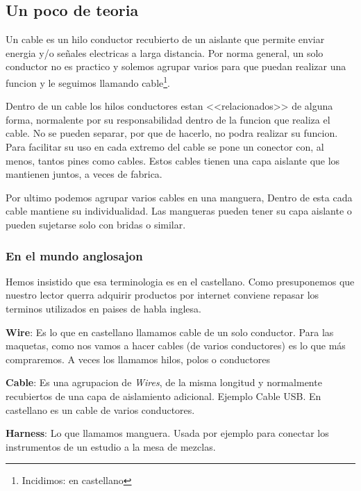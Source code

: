 
\subsection{Un poco de teoria}
Un cable es un hilo conductor recubierto de un aislante que permite enviar energia y/o señales electricas a larga distancia. Por norma general, un solo conductor no es practico y solemos agrupar varios para que puedan realizar una funcion y le seguimos llamando cable\footnote{Incidimos: en castellano}.

Dentro de un cable los hilos conductores estan <<relacionados>> de alguna forma, normalente por su responsabilidad dentro de la funcion que realiza el cable.
No se pueden separar, por que de hacerlo, no podra realizar su funcion. Para facilitar su uso en cada extremo del cable se pone un conector con, al menos, tantos pines como cables. Estos cables tienen una capa aislante que los mantienen juntos, a veces de fabrica.

Por ultimo podemos agrupar varios cables en una manguera, Dentro de esta cada cable mantiene su individualidad. Las mangueras pueden tener su capa aislante o pueden sujetarse solo con bridas o similar.

\subsubsection{En el mundo anglosajon}
Hemos insistido que esa terminologia es en el castellano. Como presuponemos que nuestro lector querra adquirir productos por internet conviene repasar los terminos utilizados en paises de habla inglesa. 

\textbf{Wire}: Es lo que en castellano llamamos cable de un solo conductor. Para las maquetas, como nos vamos a hacer cables (de varios conductores) es lo que más compraremos. A veces los llamamos hilos, polos o conductores

\textbf{Cable}: Es una agrupacion de \textit{Wires}, de la misma longitud y normalmente recubiertos de una capa de aislamiento adicional. Ejemplo Cable USB. En castellano es un cable de varios conductores.

\textbf{Harness}: Lo que llamamos manguera. Usada por ejemplo para conectar los instrumentos de un estudio a la mesa de mezclas.


